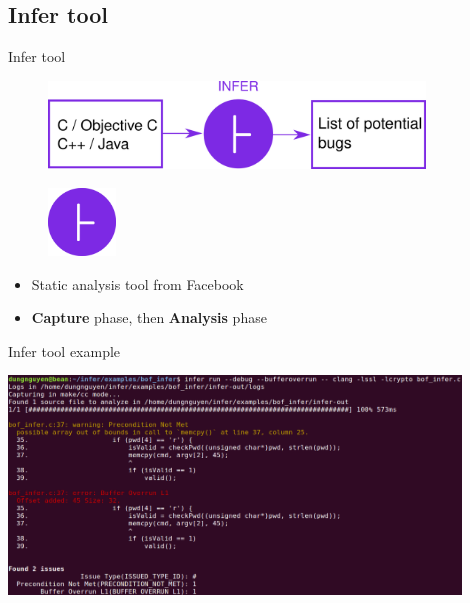 \documentclass{beamer}
\begin{document}
\subsection{Infer tool}

\begin{frame}{Infer tool}

\begin{figure}
\includegraphics[width=10cm]{Figures/InferDrawing.png}
\end{figure}

\end{frame}

\begin{frame}

\begin{figure}
\includegraphics[width = 1.8cm]{Figures/InferLogo.png}

\end{figure}

\vspace{1cm}

\begin{itemize}
\item Static analysis tool from Facebook
\item \textbf{Capture} phase, then \textbf{Analysis} phase
\end{itemize}

\end{frame}

\begin{frame}{Infer tool example}

\includegraphics[width=12cm]{Figures/main.c/inferRunOnMain.png}
\end{frame}
\end{document}
